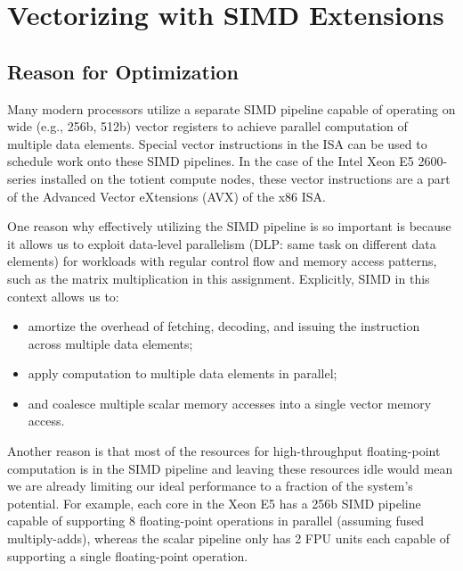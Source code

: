 
\section{Vectorizing with SIMD Extensions}
\label{sec-opts-avx}

\subsection{Reason for Optimization}

Many modern processors utilize a separate SIMD pipeline capable of
operating on wide (e.g., 256b, 512b) vector registers to achieve parallel
computation of multiple data elements. Special vector instructions in the
ISA can be used to schedule work onto these SIMD pipelines. In the case
of the Intel Xeon E5 2600-series installed on the totient compute nodes,
these vector instructions are a part of the Advanced Vector eXtensions
(AVX) of the x86 ISA.
\smallskip

One reason why effectively utilizing the SIMD pipeline is so important is
because it allows us to exploit data-level parallelism (DLP: same task on
different data elements) for workloads with regular control flow and
memory access patterns, such as the matrix multiplication in this
assignment. Explicitly, SIMD in this context allows us to:

\begin{itemize}
  \item amortize the overhead of fetching, decoding, and issuing the
    instruction across multiple data elements;
  \item apply computation to multiple data elements in parallel;
  \item and coalesce multiple scalar memory accesses into a single vector
    memory access.
\end{itemize}
\smallskip

Another reason is that most of the resources for high-throughput
floating-point computation is in the SIMD pipeline and leaving these
resources idle would mean we are already limiting our ideal performance
to a fraction of the system's potential. For example, each core in the
Xeon E5 has a 256b SIMD pipeline capable of supporting 8 floating-point
operations in parallel (assuming fused multiply-adds), whereas the scalar
pipeline only has 2 FPU units each capable of supporting a single
floating-point operation.
\smallskip

